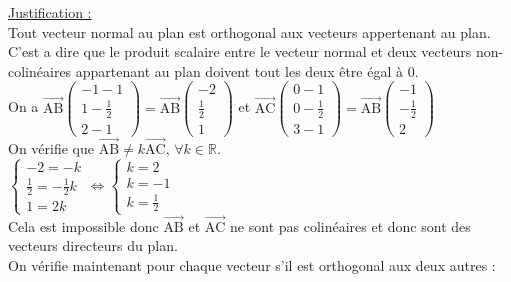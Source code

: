 \documentclass[a4paper, 12pt]{article}
\begin{document}
\noindent
\underline{Justification :}
\\
Tout vecteur normal au plan est orthogonal aux vecteurs appertenant au plan. 
C'est a dire que le produit scalaire entre le vecteur normal et deux vecteurs non-colinéaires appartenant au plan doivent tout les deux être égal à 0.
\\
On a $\overrightarrow{\text{AB}}\begin{pmatrix}-1-1\\1-\frac{1}{2} \\ 2-1\end{pmatrix} = \overrightarrow{\text{AB}}\begin{pmatrix} -2 \\ \frac{1}{2} \\ 1\end{pmatrix}$ et 
$\overrightarrow{\text{AC}}\begin{pmatrix} 0-1 \\ 0- \frac{1}{2} \\ 3-1 \end{pmatrix} = \overrightarrow{\text{AB}}\begin{pmatrix} -1 \\ -\frac{1}{2} \\ 2 \end{pmatrix}$
\\
On vérifie que $\overrightarrow{\text{AB}} \neq k\overrightarrow{\text{AC}}$, $\forall k \in \mathds{R}$.
\\
$\begin{cases} -2 = -k \\ \frac{1}{2} = -\frac{1}{2}k \\ 1 = 2k \end{cases} \Leftrightarrow \begin{cases}k = 2 \\ k = -1 \\ k = \frac{1}{2} \end{cases}$ 
\\
Cela est impossible donc $\overrightarrow{\text{AB}}$ et $\overrightarrow{\text{AC}}$ ne sont pas colinéaires et donc sont des vecteurs directeurs du plan. 
\\
On vérifie maintenant pour chaque vecteur s'il est orthogonal aux deux autres :
\vspace{3mm}
\end{document}
